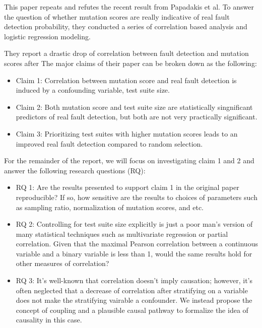 \documentclass[10pt,letterpaper]{article}
\begin{document}
This paper repeats and refutes the recent result from Papadakis et al. To answer the question of whether mutation scores are really indicative of real fault detection probability, they conducted a series of correlation based analysis and logistic regression modeling. 

They report a drastic drop of correlation between fault detection and mutation scores after  
The major claims of their paper can be broken down as the following:
\begin{itemize}
\item
Claim 1: Correlation between mutation score and real fault detection is induced by a confounding variable, test suite size. 

\item
Claim 2: Both mutation score and test suite size are statistically singnificant predictors of real fault detection, but both are not very practically significant.
\item
Claim 3: Prioritizing test suites with higher mutation scores leads to an improved real fault detection compared to random selection.

\end{itemize}

For the remainder of the report, we will focus on investigating claim 1 and 2 and answer the following research questions (RQ):

\begin{itemize}
\item
RQ 1: Are the results presented to support claim 1 in the original paper reproducible? If so, how sensitive are the results to choices of parameters such as sampling ratio, normalization of mutation scores, and etc.
\item
RQ 2: Controlling for test suite size explicitly is just a poor man's version of many statistical techniques such as multivariate regression or partial correlation. Given that the maximal Pearson correlation between a continuous variable and a binary variable is less than 1, would the same results hold for other measures of correlation? 


\item
RQ 3: It's well-known that correlation doesn't imply causation; however, it's often neglected that a decrease of correlation after stratifying on a variable does not make the stratifying vairable a confounder. We instead propose the concept of coupling and a plausible causal pathway to formalize the idea of causality in this case.

\end{itemize}
\end{document}
